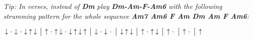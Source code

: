 \begin{song}
\bigskip

\bigskip

{
\smaller\it Tip: In verses, instead of \textbf{Dm} play \textbf{Dm-Am-F-Am6}
with the following strumming pattern for the whole sequence \textbf{Am7 Am6 F Am Dm Am F Am6}:

$\Down\Miss\Down\Miss\Down\Up\Down \Separator \Up\Miss\Up\Down\Miss\Down\Up\Down\Up \Separator
\Down\Miss\Down\Miss \Separator \Down\Up\Down \Separator \Up\Miss\Up\Down \Separator
\Up\Miss \Separator \Up\Miss \Separator \Up$
}

\end{song}
